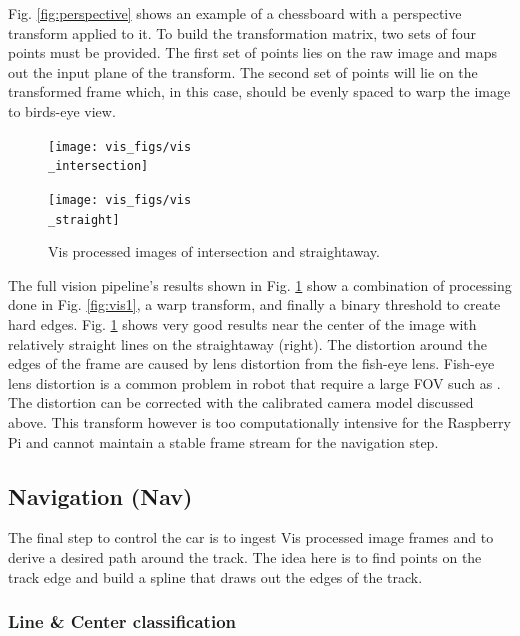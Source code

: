 \documentclass{article}
\begin{document}
Fig. \ref{fig:perspective} shows an example of a chessboard with a perspective transform applied to it. To build the transformation matrix, two sets of four points must be provided. The first set of points lies on the raw image and maps out the input plane of the transform. The second set of points will lie on the transformed frame which, in this case, should be evenly spaced to warp the image to birds-eye view.

\begin{figure}[htb]
	\begin{minipage}[b]{.48\linewidth}
		\centering
		\centerline{\texttt{[image: vis\_figs/vis\\\_intersection]}}
	\end{minipage}
	\hfill
	\begin{minipage}[b]{0.48\linewidth}
		\centering
		\centerline{\texttt{[image: vis\_figs/vis\\\_straight]}}
	\end{minipage}
	\caption{Vis processed images of intersection and straightaway.}
	\label{fig:vis2}
\end{figure}

The full vision pipeline's results shown in Fig. \ref{fig:vis2} show a combination of processing done in Fig. \ref{fig:vis1}, a warp transform, and finally a binary threshold to create hard edges. Fig. \ref{fig:vis2} shows very good results near the center of the image with relatively straight lines on the straightaway (right). The distortion around the edges of the frame are caused by lens distortion from the fish-eye lens. Fish-eye lens distortion is a common problem in robot that require a large FOV such as \cite{b1}. The distortion can be corrected with the calibrated camera model discussed above. This transform however is too computationally intensive for the Raspberry Pi and cannot maintain a stable frame stream for the navigation step.

\subsection{Navigation (Nav)}

The final step to control the car is to ingest Vis processed image frames and to derive a desired path around the track. The idea here is to find points on the track edge and build a spline that draws out the edges of the track.

\subsubsection{Line \& Center classification}
\end{document}
